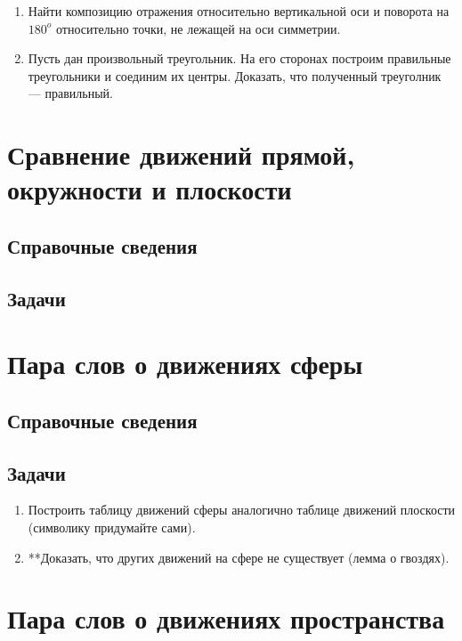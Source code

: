 \begin{enumerate}
\item Найти композицию отражения относительно вертикальной оси и поворота на $180^o$ относительно точки, не лежащей на оси симметрии.
\item Пусть дан произвольный треугольник. На его сторонах построим правильные треугольники и соединим их центры. Доказать, что полученный треуголник --- правильный.
\end{enumerate}


\section{Сравнение движений прямой, окружности и плоскости}

\subsection*{Справочные сведения}

\subsection*{Задачи}




\section{Пара слов о движениях сферы}

\subsection*{Справочные сведения}

\subsection*{Задачи}

\begin{enumerate}
\item Построить таблицу движений сферы аналогично таблице движений плоскости (символику придумайте сами).
\item **Доказать, что других движений на сфере не существует (лемма о гвоздях).
\end{enumerate}


\section{Пара слов о движениях пространства}

